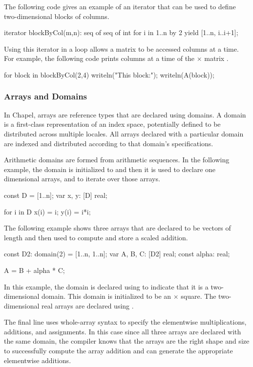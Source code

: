The following code gives an example of an iterator that can be
used to define two-dimensional blocks of  columns.
\begin{chapel}
iterator blockByCol(m,n): seq of seq of int {
  for i in 1..n by 2 yield [1..n, i..i+1];
}
\end{chapel}
Using this iterator in a  loop allows a matrix to be
accessed  columns at a time.  For example, the following
code prints  columns at a time of the  $\times$  
matrix .
\begin{chapel}
for block in blockByCol(2,4) {
  writeln("This block:");
  writeln(A(block));
}
\end{chapel}


\subsubsection{Arrays and Domains}
\label{Arrays_and_Domains}

In Chapel, arrays are reference types that are declared using domains.
A domain is a first-class representation of an index space, potentially 
defined to be distributed across multiple locales.   All arrays
declared with a particular domain are indexed and distributed according 
to that domain's specifications.  

Arithmetic domains are formed from arithmetic sequences.  In the following
example, the domain  is initialized to  and then it is
used to declare one dimensional arrays, and to iterate over those arrays.
\begin{chapel}
const D = [1..n];
var x, y: [D] real;

for i in D {
  x(i) = i;
  y(i) = i*i;
}
\end{chapel}

The following example shows three arrays that are declared to be
vectors of length  and then used to compute and store a 
scaled addition.
\begin{chapel}
const D2: domain(2) = [1..n, 1..n];
var A, B, C: [D2] real;
const alpha: real;

A = B + alpha * C;
\end{chapel}
In this example, the domain  is declared using  
 to indicate that it is a two-dimensional domain.
This domain is initialized to be an  $\times$ 
square.  The two-dimensional real arrays  are declared using
.

The final line uses whole-array syntax to specify the elementwise 
multiplications, additions, and assignments.  In this case since
all three arrays are declared with the same domain, the compiler
knows that the arrays are the right shape and size to successfully
compute the array addition and can generate the appropriate elementwise
additions.

